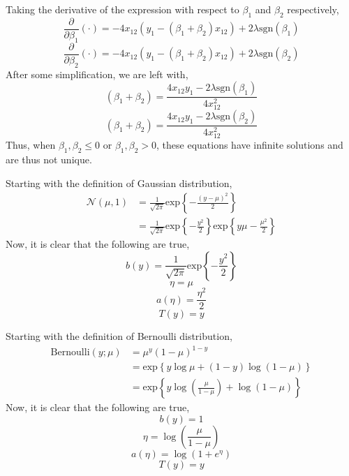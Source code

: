 \documentclass[12pt,twoside]{article}
\begin{document}
\begin{problems}
\begin{problemparts}
Taking the derivative of the expression with respect to $\beta_1$ and $\beta_2$
respectively,
$$ \frac{\partial}{\partial \beta_1}(\cdot) = - 4 x_{12} \left(y_1 - (\beta_1
+ \beta_2) x_{12}\right) + 2 \lambda \mathrm{sgn}(\beta_1) $$
$$ \frac{\partial}{\partial \beta_2}(\cdot) = - 4 x_{12} \left(y_1 - (\beta_1
+ \beta_2) x_{12}\right) + 2 \lambda \mathrm{sgn}(\beta_2) $$
After some simplification, we are left with,
$$ (\beta_1 + \beta_2) = \frac{4 x_{12} y_1 - 2 \lambda
\mathrm{sgn}(\beta_1)}{4 x_{12}^2} $$
$$ (\beta_1 + \beta_2) = \frac{4 x_{12} y_1 - 2 \lambda
\mathrm{sgn}(\beta_2)}{4 x_{12}^2} $$
Thus, when $\beta_1, \beta_2 \leq 0$ or $\beta_1, \beta_2 > 0$, these equations
have infinite solutions and are thus not unique.

\end{problemparts}

\newpage

\problem  %

\begin{problemparts}

\problempart %

Starting with the definition of Gaussian distribution,
\begin{align*}
    \mathcal{N}(\mu, 1) &= \frac{1}{\sqrt{2 \pi}}
        \mathrm{exp}\left\{-\frac{(y - \mu)^2}{2}\right\} \\
    &= \frac{1}{\sqrt{2 \pi}} \mathrm{exp}\left\{-\frac{y^2}{2}\right\}
        \mathrm{exp}\left\{y \mu - \frac{\mu^2}{2}\right\}
\end{align*}
Now, it is clear that the following are true,
$$ b(y) = \frac{1}{\sqrt{2 \pi}} \mathrm{exp}\left\{-\frac{y^2}{2}\right\} $$
$$ \eta = \mu $$
$$ a(\eta) = \frac{\eta^2}{2} $$
$$ T(y) = y $$

\problempart %

Starting with the definition of Bernoulli distribution,
\begin{align*}
    \mathrm{Bernoulli}(y; \mu) &= \mu^y (1 - \mu)^{1 - y} \\
    &= \mathrm{exp}\left\{y \log \mu + (1 - y) \log(1 - \mu) \right\} \\
    &= \mathrm{exp}\left\{y \log \left(\frac{\mu}{1 - \mu}\right) + \log(1 -
    \mu) \right\}
\end{align*}
Now, it is clear that the following are true,
$$ b(y) = 1 $$
$$ \eta = \log \left(\frac{\mu}{1 - \mu}\right) $$
$$ a(\eta) = \log \left(1 + e^\eta\right) $$
$$ T(y) = y $$

\problempart %


\end{problemparts}
\end{problems}
\end{document}
